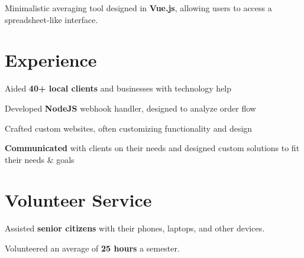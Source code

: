 \documentclass[letterpaper]{deedy-resume} %
\begin{document}
\begin{minipage}[t]{0.66\textwidth}
\sectionspace %


Minimalistic averaging tool designed in \textbf{Vue.js}, allowing users to access a spreadsheet-like interface.

\sectionspace %


\section{Experience}


\vspace{\topsep} %
\begin{tightitemize}
\item Aided \textbf{40+ local clients} and businesses with technology help
\item Developed \textbf{NodeJS} webhook handler, designed to analyze order flow
\item Crafted custom websites, often customizing functionality and design
\item \textbf{Communicated} with clients on their needs and designed custom solutions to fit their needs \& goals
\end{tightitemize}

\sectionspace %


\section{Volunteer Service}


\begin{tightitemize}
\item Assisted \textbf{senior citizens} with their phones, laptops, and other devices.
\item Volunteered an average of \textbf{25 hours} a semester.
\end{tightitemize}


\end{minipage}
\end{document}
